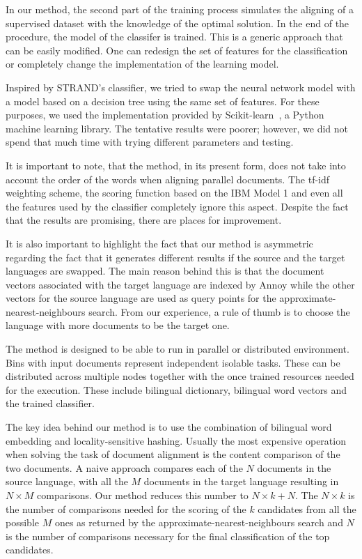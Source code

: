 In our method, the second part of the training process simulates the aligning of a supervised dataset with the knowledge of the optimal solution. In the end of the procedure, the model of the classifer is trained. This is a generic approach that can be easily modified. One can redesign the set of features for the classification or completely change the implementation of the learning model.

Inspired by STRAND's classifier, we tried to swap the neural network model with a model based on a decision tree using the same set of features. For these purposes, we used the implementation provided by Scikit-learn~\cite{Pedregosa11}, a Python machine learning library. The tentative results were poorer; however, we did not spend that much time with trying different parameters and testing.

It is important to note, that the method, in its present form, does not take into account the order of the words when aligning parallel documents. The tf-idf weighting scheme, the scoring function based on the IBM Model 1 and even all the features used by the classifier completely ignore this aspect. Despite the fact that the results are promising, there are places for improvement.

It is also important to highlight the fact that our method is asymmetric regarding the fact that it generates different results if the source and the target languages are swapped. The main reason behind this is that the document vectors associated with the target language are indexed by Annoy while the other vectors for the source language are used as query points for the approximate-nearest-neighbours search. From our experience, a rule of thumb is to choose the language with more documents to be the target one.

The method is designed to be able to run in parallel or distributed environment. Bins with input documents represent independent isolable tasks. These can be distributed across multiple nodes together with the once trained resources needed for the execution. These include bilingual dictionary, bilingual word vectors and the trained classifier.

The key idea behind our method is to use the combination of bilingual word embedding and locality-sensitive hashing. Usually the most expensive operation when solving the task of document alignment is the content comparison of the two documents. A naive approach compares each of the $N$ documents in the source language, with all the $M$ documents in the target language resulting in $N \times M$ comparisons. Our method reduces this number to $N \times k + N$. The $N \times k$ is the number of comparisons needed for the scoring of the $k$ candidates from all the possible $M$ ones as returned by the approximate-nearest-neighbours search and $N$ is the number of comparisons necessary for the final classification of the top candidates.